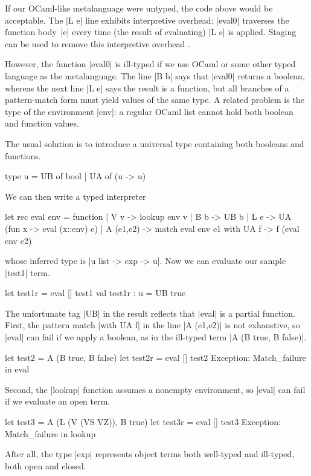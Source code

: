\documentclass[preprint]{sigplanconf}
\begin{document}
If our OCaml-like metalanguage were untyped, the code above would be acceptable.
The |L e| line exhibits interpretive overhead:
|eval0| traverses the function body~|e| every time (the result of
evaluating) |L e| is applied. Staging can be used to remove this
interpretive overhead \citep[\S1.1--2]{WalidICFP02}.

However, the function |eval0| is ill-typed
if we use OCaml or some other typed language as the metalanguage.
The line |B b|
says that |eval0| returns a boolean, whereas the next line |L e| says
the result is a function, but all branches of a pattern-match form must
yield values of the same type. 
A related problem is the type of the environment |env|: a regular
OCaml list cannot hold both boolean and function values. 

The usual solution is to introduce a universal type \citep[\S1.3]
{WalidICFP02} containing both booleans and functions.
\begin{code}
type u = UB of bool | UA of (u -> u)
\end{code}
We can then write a typed interpreter
\begin{code}
let rec eval env = function
| V v       -> lookup env v
| B b       -> UB b
| L e       -> UA (fun x -> eval (x::env) e)
| A (e1,e2) -> match eval env e1 with UA f ->
               f (eval env e2)
\end{code}
whose inferred type is |u list -> exp -> u|. Now we can evaluate
our sample |test1| term.
\begin{code}
let test1r = eval [] test1
val test1r : u = UB true 
\end{code}

The unfortunate tag |UB| in the result reflects that |eval| is a partial
function.  First, the pattern match |with UA f| in the line
|A (e1,e2)| is not exhaustive, so |eval| can fail if we apply a boolean,
as in the ill-typed term |A (B true, B false)|.
\begin{code}
let test2 = A (B true, B false)
let test2r = eval [] test2
Exception: Match_failure in eval
\end{code}
Second, the |lookup|
function assumes a nonempty environment, so |eval| can fail if we
evaluate an open term.
\begin{code}
let test3 = A (L (V (VS VZ)), B true)
let test3r = eval [] test3
Exception: Match_failure in lookup
\end{code}
After all, the type |exp| represents object
terms both well-typed and ill-typed, both open and closed.
\end{document}

